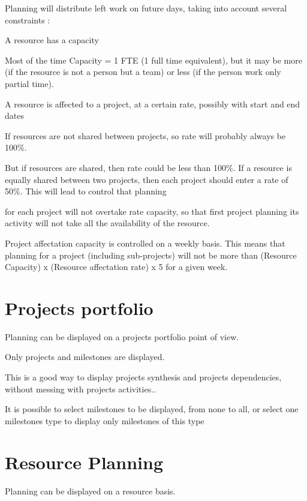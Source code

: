\documentclass[letterpaper,10pt,english]{sphinxmanual}
\begin{document}
Planning will distribute left work on future days, taking into account several constraints :

A resource has a capacity

Most of the time Capacity = 1 FTE (1 full time equivalent), but it may be more (if the resource is not a person but a team) or less (if the person work only partial time).

A resource is affected to a project, at a certain rate, possibly with start and end dates

If resources are not shared between projects, so rate will probably always be 100\%.

But if resources are shared, then rate could be less than 100\%. If a resource is equally shared between two projects, then each project should enter a rate of 50\%. This will lead to control that planning

for each project will not overtake rate capacity, so that first project planning its activity will not take all the availability of the resource.

Project affectation capacity is controlled on a weekly basis. This means that planning for a project (including sub-projects) will not be more than (Resource Capacity) x (Resource affectation rate) x 5 for a given week.


\section{Projects portfolio}
\label{Gantt:projects-portfolio}\label{Gantt:index-2}
Planning can be displayed on a projects portfolio point of view.

Only projects and milestones are displayed.

This is a good way to display projects synthesis and projects dependencies, without messing with projects activities..

It is possible to select milestones to be displayed, from none to all, or select one milestones type to display only milestones of this type


\section{Resource Planning}
\label{Gantt:resource-planning}\label{Gantt:index-3}
Planning can be displayed on a resource basis.
\end{document}
